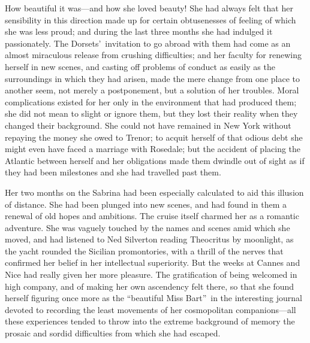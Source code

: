 \documentclass[12pt,a4paper]{book}
\begin{document}
How beautiful it was---and how she loved beauty! She had always
felt that her sensibility in this direction made up for certain
obtusenesses of feeling of which she was less proud; and during
the last three months she had indulged it passionately. The
Dorsets'\ invitation to go abroad with them had come as an almost
miraculous release from crushing difficulties; and her faculty
for renewing herself in new scenes, and casting off problems of
conduct as easily as the surroundings in which they had arisen,
made the mere change from one place to another seem, not merely a
postponement, but a solution of her troubles. Moral complications
existed for her only in the environment that had produced them;
she did not mean to slight or ignore them, but they lost their
reality when they changed their background. She could not have
remained in New York without repaying the money she owed to
Trenor; to acquit herself of that odious debt she might even have
faced a marriage with Rosedale; but the accident of placing the
Atlantic between herself and her obligations made them dwindle
out of sight as if they had been milestones and she had travelled
past them.





Her two months on the Sabrina had been especially calculated to
aid this illusion of distance. She had been plunged into
new scenes, and had found in them a renewal of old hopes and
ambitions. The cruise itself charmed her as a romantic adventure. 
She was vaguely touched by the names and scenes amid which she
moved, and had listened to Ned Silverton reading Theocritus by
moonlight, as the yacht rounded the Sicilian promontories, with a
thrill of the nerves that confirmed her belief in her
intellectual superiority. But the weeks at Cannes and Nice had
really given her more pleasure. The gratification of being
welcomed in high company, and of making her own ascendency felt
there, so that she found herself figuring once more as the
``beautiful Miss Bart''\ in the interesting journal devoted to
recording the least movements of her cosmopolitan companions---all
these experiences tended to throw into the extreme background of
memory the prosaic and sordid difficulties from which she had
escaped.
\end{document}
